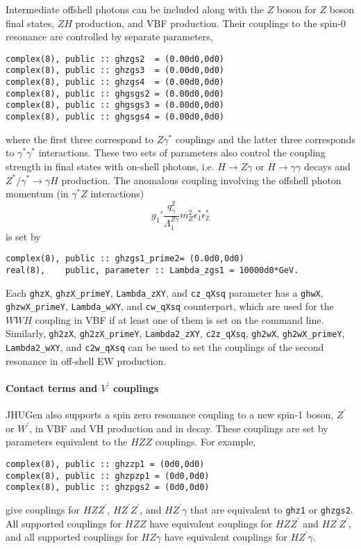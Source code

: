 \documentclass[aps,superscriptaddress,nofootinbib]{revtex4}
\begin{document}
Intermediate offshell photons can be included along with the $Z$ boson for $Z$ boson final states, $ZH$ production, and VBF production.
Their couplings to the spin-0 resonance are controlled by separate parameters,
\begin{verbatim}
complex(8), public :: ghzgs2  = (0.00d0,0d0)
complex(8), public :: ghzgs3  = (0.00d0,0d0)
complex(8), public :: ghzgs4  = (0.00d0,0d0)
complex(8), public :: ghgsgs2 = (0.00d0,0d0)
complex(8), public :: ghgsgs3 = (0.00d0,0d0)
complex(8), public :: ghgsgs4 = (0.00d0,0d0)
\end{verbatim}
where the first three correspond to $Z\gamma^*$ couplings and the latter three corresponds to $\gamma^* \gamma^*$ interactions.
These two sets of parameters also control the coupling strength in final states with on-shell photons, i.e. $H\to Z\gamma$ or $H\to \gamma\gamma$ decays and $Z^*/\gamma^*\to\gamma H$ production.
The anomalous coupling involving the offshell photon momentum (in $\gamma^* Z$ interactions)
\[
g_1' \frac{ q^2_\gamma }{ \Lambda_1^{Z\gamma} } m_Z^2 \epsilon^*_1 \epsilon^*_2
\]
is set by
\begin{verbatim}
complex(8), public :: ghzgs1_prime2= (0.0d0,0d0)
real(8),    public, parameter :: Lambda_zgs1 = 10000d0*GeV.
\end{verbatim}

Each \verb|ghzX|, \verb|ghzX_primeY|, \verb|Lambda_zXY|, and \verb|cz_qXsq| parameter has a \verb|ghwX|, \verb|ghzwX_primeY|, \verb|Lambda_wXY|, and \verb|cw_qXsq| counterpart, which are used for the $WWH$ coupling in VBF if at least one of them is set on the command line.  Similarly, \verb|gh2zX|, \verb|gh2zX_primeY|, \verb|Lambda2_zXY|, \verb|c2z_qXsq|, \verb|gh2wX|, \verb|gh2wX_primeY|, \verb|Lambda2_wXY|, and \verb|c2w_qXsq| can be used to set the couplings of the second resonance in off-shell EW production.\\

\paragraph{Contact terms and $V^\prime$ couplings}
\label{contactterms}

JHUGen also supports a spin zero resonance coupling to a new spin-1 boson, $Z^\prime$ or $W^\prime$, in VBF and VH production and in decay.
These couplings are set by parameters equivalent to the $HZZ$ couplings.  For example,
\begin{verbatim}
complex(8), public :: ghzzp1 = (0d0,0d0)
complex(8), public :: ghzpzp1 = (0d0,0d0)
complex(8), public :: ghzpgs2 = (0d0,0d0)
\end{verbatim}
give couplings for $HZZ^\prime$, $HZ^\prime Z^\prime$, and $HZ^\prime\gamma$ that are equivalent to \verb|ghz1| or \verb|ghzgs2|.  All supported couplings for $HZZ$ have equivalent couplings for $HZZ^\prime$ and $HZ^\prime Z^\prime$, and all supported couplings for $HZ\gamma$ have equivalent couplings for $HZ^\prime\gamma$.
\end{document}
